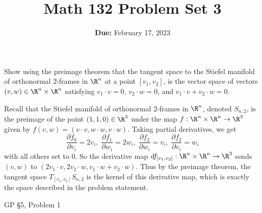 \documentclass[11pt,letterpaper]{article}
\title{\textbf{Math 132 Problem Set 3}}
\date{\textbf{Due:} February 17, 2023}
\begin{document}
\maketitle

\begin{problem}
    Show using the preimage theorem that the tangent space to the Stiefel manifold of orthonormal $2$-frames in $\R^n$ at a point $[v_1, v_2]$, is the vector space of vectors $(v,w)\in \R^n\times \R^n$ satisfying $v_1 \cdot v = 0$, $v_2\cdot w = 0$, and $v_1\cdot v + v_2\cdot w = 0$.
\end{problem}

\begin{solution}
    \quad Recall that the Stiefel manifold of orthonormal $2$-frames in $\R^n$, denoted $S_{n,2}$, is the preimage of the point $(1,1,0)\in \R^3$ under the map $f : \R^n\times \R^n \to \R^3$ given by $f(v,w)=(v\cdot v, w\cdot w, v\cdot w)$. Taking partial derivatives, we get
    \[
        \frac{\partial f_0}{\partial v_i} = 2v_i,\; \frac{\partial f_1}{\partial w_i} = 2w_i, \; \frac{\partial f_2}{\partial w_i} = v_i, \; \frac{\partial f_2}{\partial v_i} = w_i
    \]
    with all others set to $0$. So the derivative map $df_{[v_1,v_2]} : \R^n\times \R^n \to \R^3$ sends $(v,w)$ to $(2v_1\cdot v, 2v_2\cdot w, v_1\cdot w + v_2\cdot w)$. Thus by the preimage theorem, the tangent space $T_{[v_1,v_2]}S_{n,2}$ is the kernel of this derivative map, which is exactly the space described in the problem statement.
\end{solution}

\begin{problem}
    GP \S5, Problem 1
\end{problem}
\end{document}
